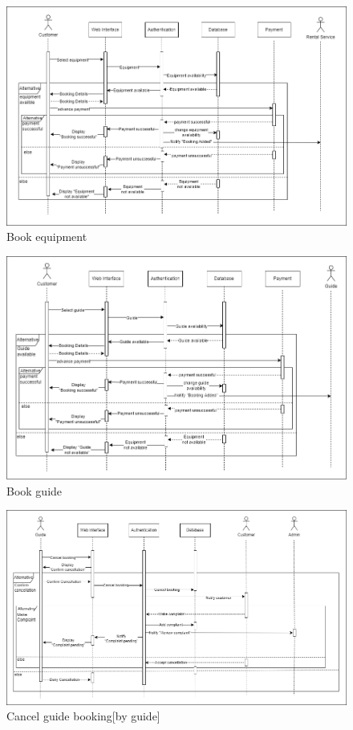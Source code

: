 \begin{figure}[h!]
    \centering
    \includegraphics[width=1\textwidth]{Images/Sequence Diagrams/Sequence diagrams-11-Book equipment.drawio.png}
    \caption{Book equipment}
\end{figure}

\begin{figure}[h!]
    \centering
    \includegraphics[width=1\textwidth]{Images/Sequence Diagrams/Sequence diagrams-12-Book guide.drawio.png}
    \caption{Book guide}
\end{figure}


\begin{figure}[h!]
    \centering
    \includegraphics[width=1\textwidth]{Images/Sequence Diagrams/Sequence diagrams-14-Cancel guide booking[by guide].drawio.png}
    \caption{Cancel guide booking[by guide]}
\end{figure}

